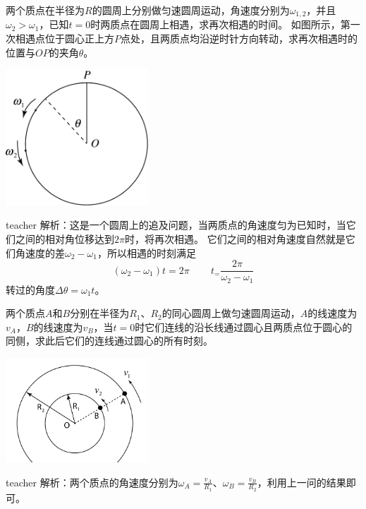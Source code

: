 \begin{example}
两个质点在半径为$R$的圆周上分别做匀速圆周运动，角速度分别为$\omega_{1,2}$，并且$\omega_2>\omega_1$，已知$t=0$时两质点在圆周上相遇，求再次相遇的时间。
如图所示，第一次相遇点位于圆心正上方$P$点处，且两质点均沿逆时针方向转动，求再次相遇时的位置与$OP$的夹角$ \theta$。
\begin{flushright}
\includegraphics[width=0.4\textwidth]{images/motion-problem-44.pdf}
\end{flushright}
\begin{taggedblock}{teacher}
\noindent
解析：这是一个圆周上的追及问题，当两质点的角速度匀为已知时，当它们之间的相对角位移达到$2\pi$时，将再次相遇。
它们之间的相对角速度自然就是它们角速度的差$\omega_2-\omega_1$，所以相遇的时刻满足
\[(\omega_2-\omega_1)t = 2\pi\,\qquad t_= \frac{2\pi}{\omega_2-\omega_1}\]
转过的角度$ \Delta \theta = \omega_1 t$。
\end{taggedblock}
\end{example}

\begin{example}
两个质点$A$和$B$分别在半径为$R_1$、$R_2$的同心圆周上做匀速圆周运动，$A$的线速度为$v_A$，$B$的线速度为$v_B$，当$t=0$时它们连线的沿长线通过圆心且两质点位于圆心的同侧，求此后它们的连线通过圆心的所有时刻。
\begin{flushright}
\includegraphics[width=0.4\textwidth]{images/motion-problem-32.pdf}
\end{flushright}
\begin{taggedblock}{teacher}
\noindent
解析：两个质点的角速度分别为$ \omega_A = \frac{v_A}{R_1}$、$ \omega_B = \frac{v_B}{R_2}$，利用上一问的结果即可。
\end{taggedblock}
\end{example}



